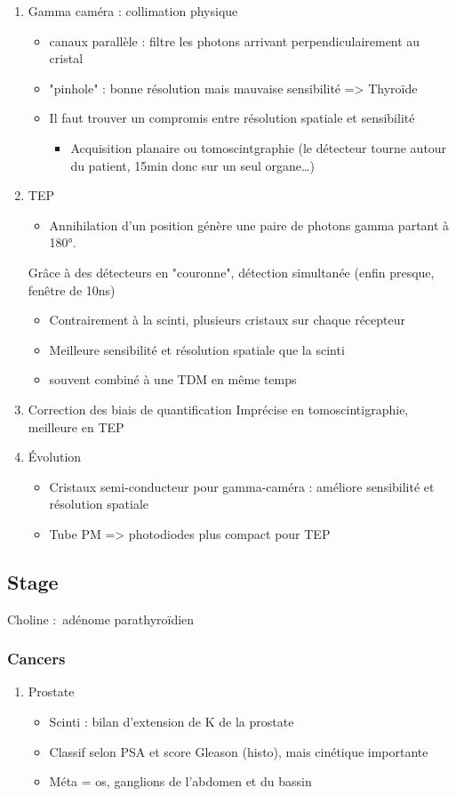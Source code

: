 \documentclass[11pt]{article}
\begin{document}
\begin{enumerate}
\item Gamma caméra : collimation physique
\label{sec:org6973d02}
\begin{itemize}
\item canaux parallèle : filtre les photons arrivant perpendiculairement au cristal
\item "pinhole" : bonne résolution mais mauvaise sensibilité => Thyroïde
\item Il faut trouver un compromis entre résolution spatiale et sensibilité
\begin{itemize}
\item Acquisition planaire ou tomoscintgraphie (le détecteur tourne autour du
patient, 15min donc sur un seul organe\ldots{})
\end{itemize}
\end{itemize}
\item TEP
\label{sec:org61b9643}
\begin{itemize}
\item Annihilation d'un position génère une paire de photons gamma partant à 180°.
\end{itemize}
Grâce à des détecteurs en "couronne", détection simultanée (enfin presque,
fenêtre de 10ns)
\begin{itemize}
\item Contrairement à la scinti, plusieurs cristaux sur chaque récepteur
\item Meilleure sensibilité et résolution spatiale que la scinti
\item souvent combiné à une TDM en même temps
\end{itemize}
\item Correction des biais de quantification
\label{sec:orgd4682d7}
Imprécise en tomoscintigraphie, meilleure en TEP
\item Évolution
\label{sec:org0083ad7}
\begin{itemize}
\item Cristaux semi-conducteur pour gamma-caméra : améliore sensibilité et résolution spatiale
\item Tube PM => photodiodes plus compact pour TEP
\end{itemize}
\end{enumerate}
\subsection{Stage}
\label{sec:org9546ac6}
Choline : adénome parathyroïdien
\subsubsection{Cancers}
\label{sec:org6652539}
\begin{enumerate}
\item Prostate
\label{sec:orgc602248}
\begin{itemize}
\item Scinti : bilan d'extension de K de la prostate
\item Classif selon PSA et score Gleason (histo), mais cinétique importante
\item Méta  = os, ganglions de l'abdomen et du bassin
\end{itemize}
\end{enumerate}
\end{document}
